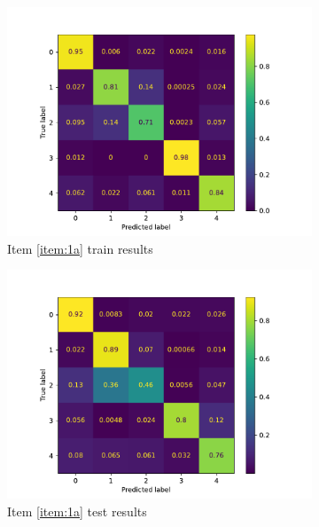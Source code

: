 \documentclass[10pt, a4paper]{article}
\begin{document}
\begin{figure}[htpb]
  \centering
  \begin{subfigure}[b]{0.47\textwidth}
      \centering
      \includegraphics[width=\textwidth]{images/Patch32_imagenet_cm_train.pdf}
      \caption{Item \ref{item:1a} train results}
      \label{fig:q1a_cm_train}
  \end{subfigure}
  \hfill
  \begin{subfigure}[b]{0.47\textwidth}
    \centering
    \includegraphics[width=\textwidth]{images/Patch32_imagenet_cm_test.pdf}
    \caption{Item \ref{item:1a} test results}
    \label{fig:q1a_cm_test}
  \end{subfigure}
  \hfill
  \begin{subfigure}[b]{0.47\textwidth}

\end{subfigure}
\end{figure}
\end{document}
